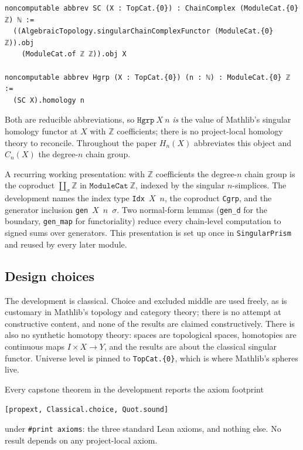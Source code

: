 \documentclass[11pt]{article}
\theoremstyle{remark}
\newcommand{\Z}{\mathbb{Z}}
\newcommand{\leanname}[1]{\texttt{#1}}
\begin{document}
\begin{lstlisting}
noncomputable abbrev SC (X : TopCat.{0}) : ChainComplex (ModuleCat.{0} ℤ) ℕ :=
  ((AlgebraicTopology.singularChainComplexFunctor (ModuleCat.{0} ℤ)).obj
    (ModuleCat.of ℤ ℤ)).obj X

noncomputable abbrev Hgrp (X : TopCat.{0}) (n : ℕ) : ModuleCat.{0} ℤ :=
  (SC X).homology n
\end{lstlisting}

Both are reducible abbreviations, so $\leanname{Hgrp}\ X\ n$ \emph{is} the
value of Mathlib's singular homology functor at $X$ with $\Z$ coefficients;
there is no project-local homology theory to reconcile. Throughout the paper
$H_n(X)$ abbreviates this object and $C_n(X)$ the degree-$n$ chain group.

A recurring working presentation: with $\Z$ coefficients the degree-$n$
chain group is the coproduct $\coprod_{\sigma} \Z$ in
$\leanname{ModuleCat}\ \Z$, indexed by the singular $n$-simplices. The
development names the index type \leanname{Idx}~$X$~$n$, the coproduct
\leanname{Cgrp}, and the generator inclusion \leanname{gen}~$X$~$n$~$\sigma$.
Two normal-form lemmas (\leanname{gen\_d} for the boundary,
\leanname{gen\_map} for functoriality) reduce every chain-level computation
to signed sums over generators. This presentation is set up once in
\leanname{SingularPrism} and reused by every later module.

\subsection{Design choices}

The development is classical. Choice and excluded middle are used freely, as
is customary in Mathlib's topology and category theory; there is no attempt
at constructive content, and none of the results are claimed constructively.
There is also no synthetic homotopy theory: spaces are topological spaces,
homotopies are continuous maps $I \times X \to Y$, and the results are about
the classical singular functor. Universe level is pinned to
\leanname{TopCat.\{0\}}, which is where Mathlib's spheres live.

Every capstone theorem in the development reports the axiom footprint
\begin{center}
\texttt{[propext, Classical.choice, Quot.sound]}
\end{center}
under \texttt{\#print axioms}: the three standard Lean axioms, and nothing
else. No result depends on any project-local axiom.
\end{document}
